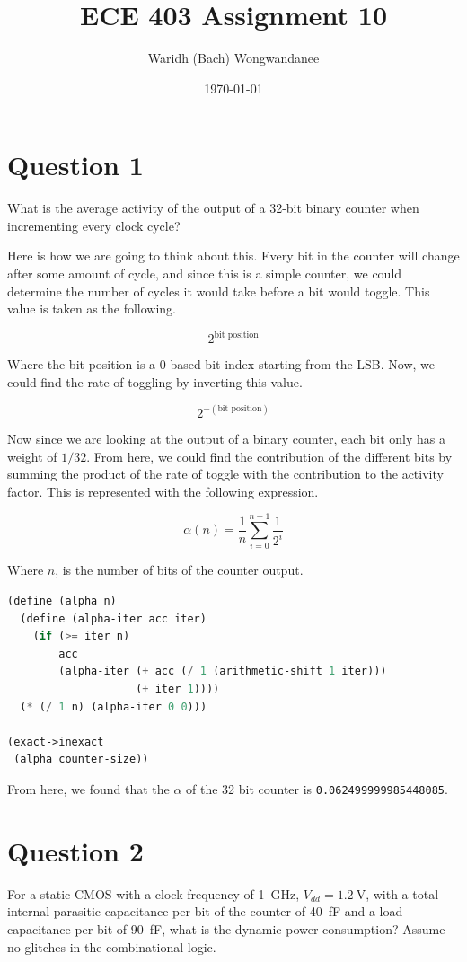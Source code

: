 \documentclass[hidelinks, 12pt]{article}
\author{Waridh (Bach) Wongwandanee}
\date{\today}
\title{ECE 403 Assignment 10}
\begin{document}
\section*{Question 1}
\label{sec:orgcb34e1a}
What is the average activity of the output of a 32-bit binary counter when incrementing every clock cycle?

Here is how we are going to think about this.
Every bit in the counter will change after some amount of cycle, and since this is a simple counter, we could determine the number of cycles it would take before a bit would toggle.
This value is taken as the following.

\[2^{\text{bit position}}\]

Where the bit position is a 0-based bit index starting from the LSB.
Now, we could find the rate of toggling by inverting this value.

\[2^{- \left( \text{bit position} \right)}\]

Now since we are looking at the output of a binary counter, each bit only has a weight of \(1/32\).
From here, we could find the contribution of the different bits by summing the product of the rate of toggle with the contribution to the activity factor.
This is represented with the following expression.

\[\alpha(n) = \frac{1}{n} \sum_{i=0}^{n-1} \frac{1}{2^i}\]

Where \(n\), is the number of bits of the counter output.

\begin{lstlisting}[frame=single,basicstyle=\ttfamily,keywordstyle=\color{black}\bfseries\underbar,language=Lisp,label=lst-alpha-solver,caption={Racket implementation used to find \(\alpha\)},captionpos=b,numbers=none]
(define (alpha n)
  (define (alpha-iter acc iter)
    (if (>= iter n)
        acc
        (alpha-iter (+ acc (/ 1 (arithmetic-shift 1 iter)))
                    (+ iter 1))))
  (* (/ 1 n) (alpha-iter 0 0)))

(exact->inexact
 (alpha counter-size))
\end{lstlisting}

From here, we found that the \(\alpha\) of the 32 bit counter is \texttt{0.062499999985448085}.
\section*{Question 2}
\label{sec:orgc1e3a0b}
For a static CMOS with a clock frequency of \qty{1}{\giga\hertz}, \(V_{dd}=\qty{1.2}{\volt}\), with a total internal parasitic capacitance per bit of the counter of \qty{40}{\femto\farad} and a load capacitance per bit of \qty{90}{\femto\farad}, what is the dynamic power consumption? Assume no glitches in the combinational logic.
\end{document}
